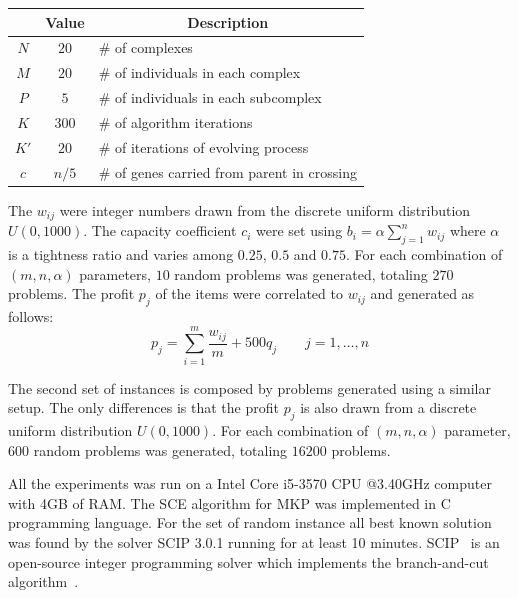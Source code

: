 \documentclass[a0,portrait]{a0poster}
\newcommand{\spc}{\phantom{a}}
\begin{document}
\begin{multicols}{2}
\begin{table}
  \begin{tabular}{|c|c|l|}
  \hline
  \multicolumn{1}{|c}{\rule{0pt}{12pt} \spc } & \multicolumn{1}{|c|}{\bf \spc Value \spc } & \multicolumn{1}{c|}{\bf Description} \\[2pt]
  \hline\rule{0pt}{12pt}
  $N$  & $20$  & \spc \# of complexes \\
  $M$  & $20$  & \spc \# of individuals in each complex \\
  $P$  & $5$   & \spc \# of individuals in each subcomplex \\
  $K$  & $300$ & \spc \# of algorithm iterations \\
  $K'$ & $20$  & \spc \# of iterations of evolving process \\
  $c$  & $n/5$ & \spc \# of genes carried from parent in crossing \\[2pt]
  \hline
  \end{tabular}
  \label{tab:params}
\end{table}

The $w_{ij}$ were integer numbers drawn from the discrete uniform distribution
$U(0, 1000)$.
The capacity coefficient $c_i$ were set using
$b_i = \alpha\sum_{j=1}^{n} w_{ij}$ where $\alpha$ is a tightness ratio and
varies among $0.25$, $0.5$ and $0.75$.
For each combination of $(m,n,\alpha)$ parameters, $10$ random problems was generated,
totaling $270$ problems.
The profit $p_j$ of the items were correlated to $w_{ij}$ and generated as follows:
\begin{displaymath}
  p_j = \sum_{i=1}^m \frac{w_{ij}}{m} + 500q_j \qquad j = 1, \ldots, n
\end{displaymath}

The second set of instances is composed by problems generated using a similar
setup.
The only differences is that the profit $p_j$ is also drawn from a discrete uniform
distribution $U(0, 1000)$.
For each combination of $(m, n, \alpha)$ parameter, $600$ random problems was
generated, totaling $16200$ problems.


All the experiments was run on a Intel Core i5-3570 CPU @3.40GHz computer
with 4GB of RAM.
The SCE algorithm for MKP was implemented in C programming language.
For the set of random instance all best known solution was found by the solver
SCIP 3.0.1 running for at least 10 minutes.
SCIP~\cite{achterberg2009scip} is an open-source integer programming solver which
implements the branch-and-cut algorithm~\cite{padberg1991branch}.
\\


\end{multicols}
\end{document}

